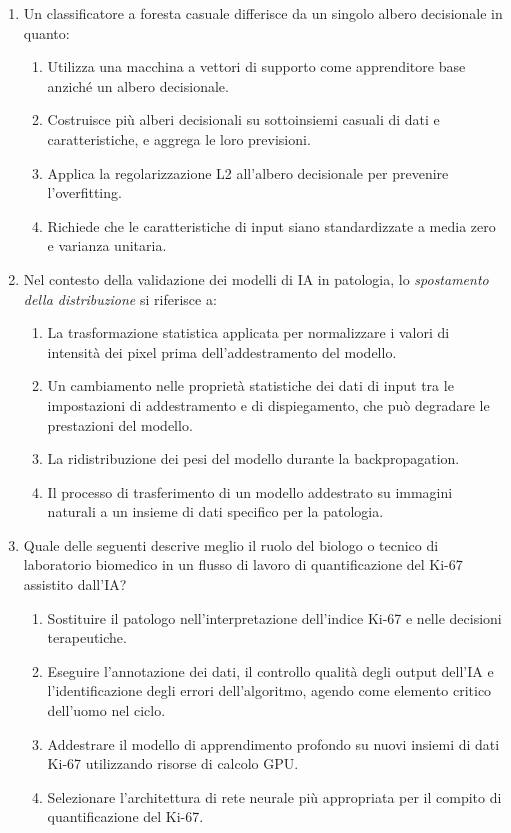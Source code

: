 \begin{enumerate}
    \item \label{ch3:q7} Un classificatore a foresta casuale differisce da un singolo albero decisionale in quanto:
    \begin{enumerate}[label=\Alph*.]
        \item Utilizza una macchina a vettori di supporto come apprenditore base anziché un albero decisionale.
        \item Costruisce più alberi decisionali su sottoinsiemi casuali di dati e caratteristiche, e aggrega le loro previsioni.
        \item Applica la regolarizzazione L2 all'albero decisionale per prevenire l'overfitting.
        \item Richiede che le caratteristiche di input siano standardizzate a media zero e varianza unitaria.
    \end{enumerate}

    \item \label{ch3:q8} Nel contesto della validazione dei modelli di IA in patologia, lo \textit{spostamento della distribuzione} si riferisce a:
    \begin{enumerate}[label=\Alph*.]
        \item La trasformazione statistica applicata per normalizzare i valori di intensità dei pixel prima dell'addestramento del modello.
        \item Un cambiamento nelle proprietà statistiche dei dati di input tra le impostazioni di addestramento e di dispiegamento, che può degradare le prestazioni del modello.
        \item La ridistribuzione dei pesi del modello durante la backpropagation.
        \item Il processo di trasferimento di un modello addestrato su immagini naturali a un insieme di dati specifico per la patologia.
    \end{enumerate}

    \item \label{ch3:q9} Quale delle seguenti descrive meglio il ruolo del biologo o tecnico di laboratorio biomedico in un flusso di lavoro di quantificazione del Ki-67 assistito dall'IA?
    \begin{enumerate}[label=\Alph*.]
        \item Sostituire il patologo nell'interpretazione dell'indice Ki-67 e nelle decisioni terapeutiche.
        \item Eseguire l'annotazione dei dati, il controllo qualità degli output dell'IA e l'identificazione degli errori dell'algoritmo, agendo come elemento critico dell'uomo nel ciclo.
        \item Addestrare il modello di apprendimento profondo su nuovi insiemi di dati Ki-67 utilizzando risorse di calcolo GPU.
        \item Selezionare l'architettura di rete neurale più appropriata per il compito di quantificazione del Ki-67.
    \end{enumerate}


\end{enumerate}
